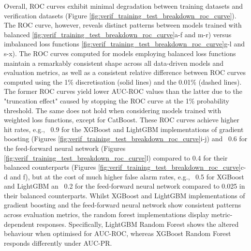 \documentclass[nhess, manuscript]{copernicus}
\begin{document}
Overall, ROC curves exhibit minimal degradation between training datasets and verification datasets (Figure \ref{fig:verif_training_test_breakdown_roc_curve}). The ROC curve, however, reveals distinct patterns between models trained with balanced \ref{fig:verif_training_test_breakdown_roc_curve}a-f and m-r) versus imbalanced loss functions \ref{fig:verif_training_test_breakdown_roc_curve}g-l and s-x). The ROC curves computed for models employing balanced loss functions maintain a remarkably consistent shape across all data-driven models and evaluation metrics, as well as a consistent relative difference between ROC curves computed using the 1\% discretisation (solid lines) and the 0.01\% (dashed lines). The former ROC curves yield lower AUC-ROC values than the latter due to the "truncation effect" caused by stopping the ROC curve at the 1\% probability threshold. The same does not hold when considering models trained with weighted loss functions, except for CatBoost. These ROC curves achieve higher hit rates, e.g., ~0.9 for the XGBoost and LightGBM implementations of gradient boosting (Figures \ref{fig:verif_training_test_breakdown_roc_curve}i-j) and ~0.6 for the feed-forward neural network (Figures \ref{fig:verif_training_test_breakdown_roc_curve}l) compared to 0.4 for their balanced counterparts (Figures \ref{fig:verif_training_test_breakdown_roc_curve}c-d and f), but at the cost of much higher false alarm rates, e.g., ~0.5 for XGBoost and LightGBM an ~0.2 for the feed-forward neural network compared to 0.025 in their balanced counterparts. Whilst XGBoost and LightGBM implementations of gradient boosting and the feed-forward neural network show consistent patterns across evaluation metrics, the random forest implementations display metric-dependent responses. Specifically, LightGBM Random Forest shows the altered behaviour when optimised for AUC-ROC, whereas XGBoost Random Forest responds differently under AUC-PR.
\end{document}
